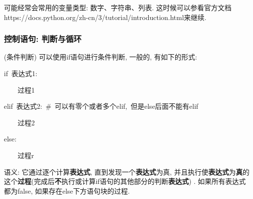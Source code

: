 可能经常会常用的变量类型: 数字、字符串、列表. 这时候可以参看官方文档https://docs.python.org/zh-cn/3/tutorial/introduction.html来继续.

\subsubsection{控制语句: 判断与循环}
\begin{definition}
(条件判断) 可以使用if语句进行条件判断, 一般的, 有如下的形式:

\noindent\begin{minipage}[t]{1\columnwidth}%
\begin{lyxcode}
if~表达式1:

~~~~过程1

elif~表达式2:~\#~可以有零个或者多个elif,~但是else后面不能有elif

~~~~过程2

else:

~~~~过程r
\end{lyxcode}
%
\end{minipage}
\end{definition}
语义: 它通过逐个计算\textbf{表达式}, 直到发现一个\textbf{表达式}为真, 并且执行使\textbf{表达式}为\textbf{真}的这个\textbf{过程}(完成后\textbf{不}执行或计算if语句的其他部分的判断\textbf{表达式})
. 如果所有表达式都为false, 如果存在else下方语句块的过程.

